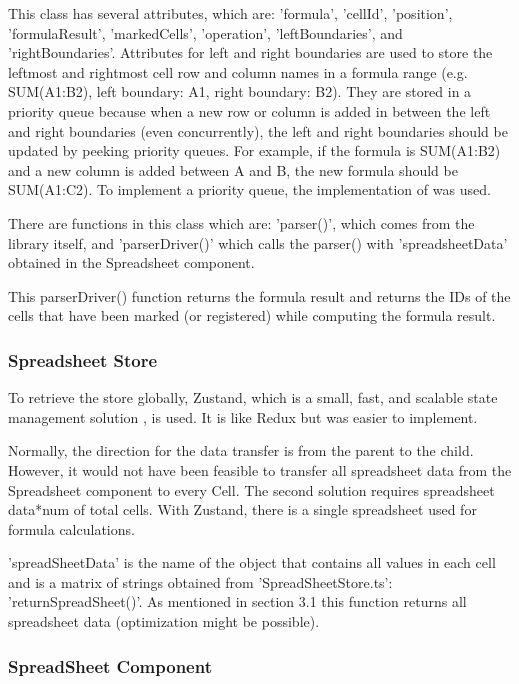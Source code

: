 \documentclass{article}
\begin{document}
This class has several attributes, which are: 'formula', 'cellId', 'position', 'formulaResult', 'markedCells', 'operation', 'leftBoundaries', and 'rightBoundaries'.
Attributes for left and right boundaries are used to store the leftmost and rightmost cell row and column names in a formula range (e.g. SUM(A1:B2), left boundary: A1, right boundary: B2).
They are stored in a priority queue because when a new row or column is added in between the left and right boundaries (even concurrently), 
the left and right boundaries should be updated by peeking priority queues. 
For example, if the formula is SUM(A1:B2) and a new column is added between A and B, the new formula should be SUM(A1:C2). 
To implement a priority queue, the implementation of \textcite{aissi2024priorityqueue} was used. 


There are functions in this class which are: 'parser()', which comes from the library itself, and 'parserDriver()' 
which calls the parser() with 'spreadsheetData' obtained in the Spreadsheet component. 


This parserDriver() function returns the formula result and returns the IDs of the cells that have been marked 
(or registered) while computing the formula result.


\subsubsection{Spreadsheet Store}

To retrieve the store globally, Zustand, which is a small, fast, and scalable state management solution \cite{zustand}, is used. 
It is like Redux but was easier to implement.

Normally, the direction for the data transfer is from the parent to the child. 
However, it would not have been feasible to transfer all spreadsheet data from the Spreadsheet component to every Cell.
The second solution requires spreadsheet data*num of total cells. 
With Zustand, there is a single spreadsheet used for formula calculations.

'spreadSheetData' is the name of the object that contains all values in each cell and is a matrix of strings obtained from 'SpreadSheetStore.ts': 'returnSpreadSheet()'. 
As mentioned in section 3.1 this function returns all spreadsheet data (optimization might be possible).

\subsubsection{SpreadSheet Component}
\end{document}

